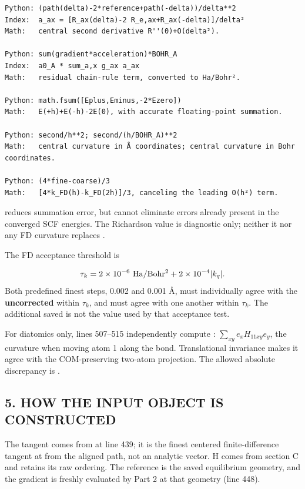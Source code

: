 \documentclass[10pt,a4paper]{article}
\begin{document}
\begin{Verbatim}
Python: (path(delta)-2*reference+path(-delta))/delta**2
Index:  a_ax = [R_ax(delta)-2 R_e,ax+R_ax(-delta)]/delta²
Math:   central second derivative R''(0)+O(delta²).

Python: sum(gradient*acceleration)*BOHR_A
Index:  a0_A * sum_a,x g_ax a_ax
Math:   residual chain-rule term, converted to Ha/Bohr².

Python: math.fsum([Eplus,Eminus,-2*Ezero])
Math:   E(+h)+E(-h)-2E(0), with accurate floating-point summation.

Python: second/h**2; second/(h/BOHR_A)**2
Math:   central curvature in Å coordinates; central curvature in Bohr coordinates.

Python: (4*fine-coarse)/3
Math:   [4*k_FD(h)-k_FD(2h)]/3, canceling the leading O(h²) term.
\end{Verbatim}
 reduces summation error, but cannot eliminate errors already present in the converged SCF energies. The Richardson value is diagnostic only; neither it nor any FD curvature replaces .

The FD acceptance threshold is

\[
\tau_k=2\times10^{-6}\ {\rm Ha/Bohr^2}+2\times10^{-4}|k_q|.
\]
Both predefined finest steps, 0.002 and 0.001 Å, must individually agree with the \textbf{uncorrected}  within \(\tau_k\), and must agree with one another within \(\tau_k\). The additional saved  is not the value used by that acceptance test.

For diatomics only, lines 507–515 independently compute : \(\sum_{xy}e_x H_{11xy}e_y\), the curvature when moving atom 1 along the bond. Translational invariance makes it agree with the COM-preserving two-atom projection. The allowed absolute discrepancy is .

\subsection{5. HOW THE INPUT OBJECT IS CONSTRUCTED}
The tangent comes from  at line 439; it is the finest centered finite-difference tangent at  from the aligned path, not an analytic vector. H comes from section C and retains its raw  ordering. The reference is the saved equilibrium geometry, and the gradient is freshly evaluated by Part 2 at that geometry (line 448).
\end{document}
